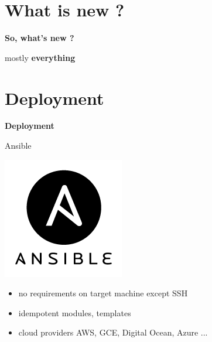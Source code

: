 \documentclass[12pt]{beamer}
\begin{document}
\section{What is new ?}
\begin{frame}
	\begin{center}
		\LARGE\textbf{So, what's new ?}	
	\end{center}
\end{frame}

\begin{frame}
	\begin{center}
		mostly \textbf{everything}
	\end{center}
\end{frame}


\section{Deployment}
\begin{frame}
	\begin{center}
		\LARGE\textbf{Deployment}	
	\end{center}
\end{frame}

\begin{frame}{Ansible}
	\begin{center}
		\includegraphics[keepaspectratio=true,height=0.4\textheight]{images/ansible.png}
	\end{center}
	\begin{itemize}
		\item no requirements on target machine except SSH
		\item idempotent modules, templates
		\item cloud providers AWS, GCE, Digital Ocean, Azure ...
	\end{itemize}
\end{frame}
\end{document}
